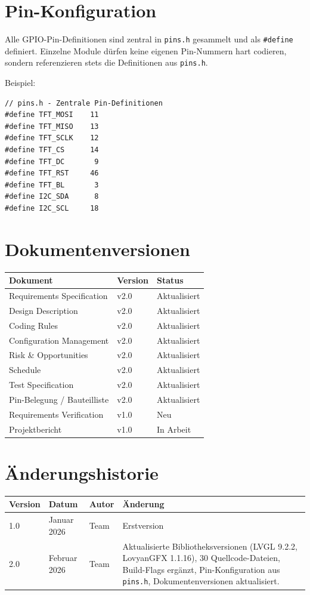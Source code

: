 \documentclass[a4paper,11pt]{article}
\begin{document}
\section{Pin-Konfiguration}

Alle GPIO-Pin-Definitionen sind zentral in \texttt{pins.h} gesammelt und als \texttt{\#define} definiert. Einzelne Module dürfen keine eigenen Pin-Nummern hart codieren, sondern referenzieren stets die Definitionen aus \texttt{pins.h}.

Beispiel:
\begin{lstlisting}
// pins.h - Zentrale Pin-Definitionen
#define TFT_MOSI    11
#define TFT_MISO    13
#define TFT_SCLK    12
#define TFT_CS      14
#define TFT_DC       9
#define TFT_RST     46
#define TFT_BL       3
#define I2C_SDA      8
#define I2C_SCL     18
\end{lstlisting}

\section{Dokumentenversionen}

\begin{tabularx}{\textwidth}{lll}
\toprule
\rowcolor{tableheader}
\textbf{Dokument} & \textbf{Version} & \textbf{Status} \\
\midrule
Requirements Specification & v2.0 & Aktualisiert \\
Design Description & v2.0 & Aktualisiert \\
Coding Rules & v2.0 & Aktualisiert \\
Configuration Management & v2.0 & Aktualisiert \\
Risk \& Opportunities & v2.0 & Aktualisiert \\
Schedule & v2.0 & Aktualisiert \\
Test Specification & v2.0 & Aktualisiert \\
Pin-Belegung / Bauteilliste & v2.0 & Aktualisiert \\
Requirements Verification & v1.0 & Neu \\
Projektbericht & v1.0 & In Arbeit \\
\bottomrule
\end{tabularx}

\section{Änderungshistorie}

\begin{tabularx}{\textwidth}{l l l X}
\toprule
\rowcolor{tableheader}
\textbf{Version} & \textbf{Datum} & \textbf{Autor} & \textbf{Änderung} \\
\midrule
1.0 & Januar 2026 & Team & Erstversion \\
2.0 & Februar 2026 & Team & Aktualisierte Bibliotheksversionen (LVGL 9.2.2, LovyanGFX 1.1.16), 30 Quellcode-Dateien, Build-Flags ergänzt, Pin-Konfiguration aus \texttt{pins.h}, Dokumentenversionen aktualisiert. \\
\bottomrule
\end{tabularx}
\end{document}
